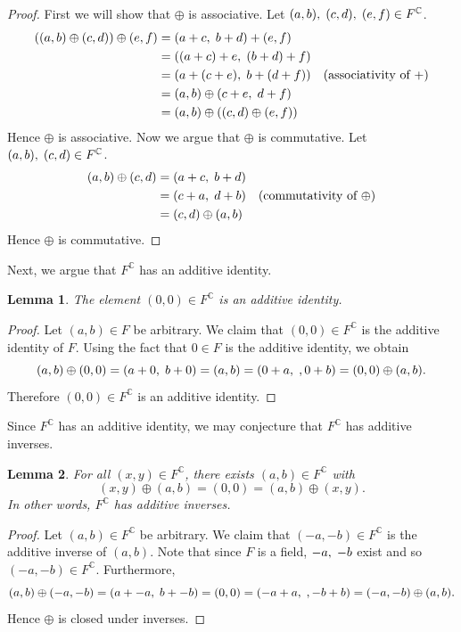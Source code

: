 \documentclass[12pt]{article}
\newcommand{\C}{\mathbb{C}}
\newcommand{\ttc}{, \hspace{1mm}}
\theoremstyle{plain}
\newtheorem{lemma}{Lemma}[section]
\theoremstyle{definition}
\begin{document}
\begin{appendices}
\begin{proof}
First we will show that $\oplus$ is associative. Let $(a,b)\ttc(c,d)\ttc(e,f)\in F^\C$.
\begin{align*}
	((a,b)\oplus(c,d))\oplus(e,f) & = (a + c\ttc b + d) + (e,f)\\
	& = ((a + c) + e\ttc (b + d) + f)\\
	& = (a + (c + e)\ttc b + (d + f)) & \text{(associativity of $+$)}\\
	& = (a,b) \oplus (c + e\ttc d + f)\\
	& = (a,b)\oplus ((c,d) \oplus (e,f))
\end{align*}
Hence $\oplus$ is associative. Now we argue that $\oplus$ is commutative. Let $(a,b)\ttc(c,d)\in F^\C$.
\begin{align*}
	(a,b)\oplus (c,d) & = (a + c\ttc b + d)\\
	& = (c + a\ttc d + b) & \text{(commutativity of $\oplus$)}\\
	& = (c,d)\oplus (a,b)
\end{align*}
Hence $\oplus$ is commutative. 
\end{proof}

Next, we argue that $F^\C$ has an additive identity.\\

\begin{lemma}
	The element $(0,0)\in F^\C$ is an additive identity.
\end{lemma}

\begin{proof}
Let $(a,b)\in F$ be arbitrary. We claim that $(0,0)\in F^\C$ is the additive identity of $F$. Using the fact that $0\in F$ is the additive identity, we obtain
	\[
		(a,b)\oplus (0,0) = (a + 0\ttc b + 0) = (a,b) = (0 + a\ttc, 0 + b) = (0,0) \oplus (a,b).
	\]
Therefore $(0,0)\in F^\C$ is an additive identity.
\end{proof} 

Since $F^\C$ has an additive identity, we may conjecture that $F^\C$ has additive inverses. 

\begin{lemma}
	For all $(x,y)\in F^\C$, there exists $(a,b)\in F^\C$ with 
	\[	
		(x,y)\oplus (a,b) = (0,0) = (a,b)\oplus (x,y).
	\]
	In other words, $F^\C$ has additive inverses.
\end{lemma}

\begin{proof}
Let $(a,b)\in F^\C$ be arbitrary. We claim that $(-a,-b)\in F^\C$ is the additive inverse of $(a,b)$. Note that since $F$ is a field, $-a\ttc -b$ exist and so $(-a,-b)\in F^\C$. Furthermore,
	\[
		(a,b)\oplus (-a,-b) = (a + -a\ttc b + -b) = (0,0) = (-a + a\ttc, -b + b) = (-a,-b) \oplus (a,b).
	\]
	Hence $\oplus$ is closed under inverses.
\end{proof}


\end{appendices}
\end{document}
